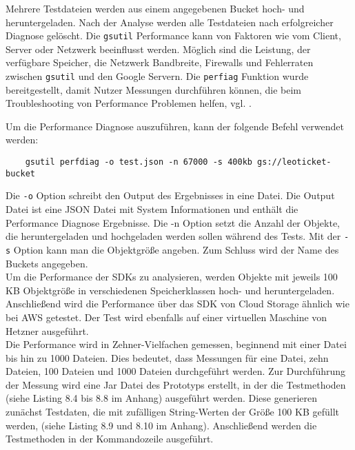 Mehrere Testdateien werden aus einem angegebenen Bucket hoch- und heruntergeladen. Nach der Analyse werden alle Testdateien nach erfolgreicher Diagnose gelöscht. Die \verb|gsutil| Performance kann von Faktoren wie vom Client, Server oder Netzwerk beeinflusst werden. Möglich sind die Leistung, der verfügbare Speicher, die Netzwerk Bandbreite, Firewalls und Fehlerraten zwischen \verb|gsutil| und den Google Servern. Die \verb|perfiag| Funktion wurde bereitgestellt, damit Nutzer Messungen durchführen können, die beim Troubleshooting von Performance Problemen helfen, vgl. \cite{gc-perfdiag}.

\newpage

Um die Performance Diagnose auszuführen, kann der folgende Befehl verwendet werden:

\begin{lstlisting}
	gsutil perfdiag -o test.json -n 67000 -s 400kb gs://leoticket-bucket
\end{lstlisting}

Die \verb|-o| Option schreibt den Output des Ergebnisses in eine Datei. Die Output Datei ist eine JSON Datei mit System Informationen und enthält die Performance Diagnose Ergebnisse. Die -n Option setzt die Anzahl der Objekte, die heruntergeladen und hochgeladen werden sollen während des Tests. Mit der \verb|-s| Option kann man die Objektgröße angeben. Zum Schluss wird der Name des Buckets angegeben.\\

Um die Performance der SDKs zu analysieren, werden Objekte mit jeweils 100 KB Objektgröße in verschiedenen Speicherklassen hoch- und heruntergeladen. Anschließend wird die Performance über das SDK von Cloud Storage ähnlich wie bei AWS getestet. Der Test wird ebenfalls auf einer virtuellen Maschine von Hetzner ausgeführt.\\

Die Performance wird in Zehner-Vielfachen gemessen, beginnend mit einer Datei bis hin zu 1000 Dateien. Dies bedeutet, dass Messungen für eine Datei, zehn Dateien, 100 Dateien und 1000 Dateien durchgeführt werden. Zur Durchführung der Messung wird eine Jar Datei des Prototyps erstellt, in der die Testmethoden (siehe Listing 8.4 bis 8.8 im Anhang) ausgeführt werden. Diese generieren zunächst Testdaten, die mit zufälligen String-Werten der Größe 100 KB gefüllt werden, (siehe Listing 8.9 und 8.10 im Anhang). Anschließend werden die Testmethoden in der Kommandozeile ausgeführt. 

\newpage

